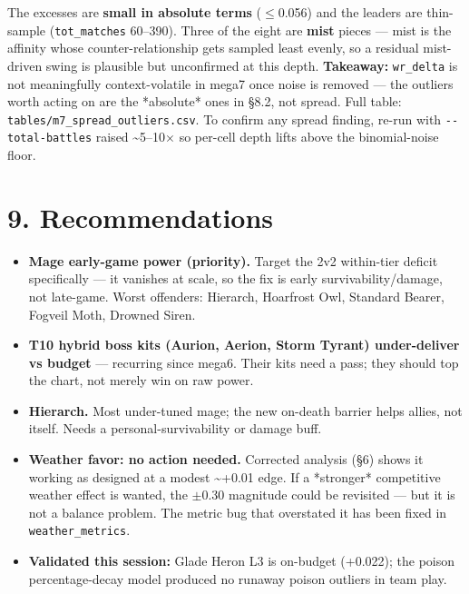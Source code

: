 \documentclass[10pt]{article}
\begin{document}
The excesses are \textbf{small in absolute terms} ($\leq$0.056) and the leaders are thin-sample (\texttt{tot\_\allowbreak{}matches} 60--390). Three of the eight are \textbf{mist} pieces --- mist is the affinity whose counter-relationship gets sampled least evenly, so a residual mist-driven swing is plausible but unconfirmed at this depth. \textbf{Takeaway:} \texttt{wr\_\allowbreak{}delta} is not meaningfully context-volatile in mega7 once noise is removed --- the outliers worth acting on are the *absolute* ones in \S{}8.2, not spread. Full table: \texttt{tables/\allowbreak{}m7\_\allowbreak{}spread\_\allowbreak{}outliers.\allowbreak{}csv}. To confirm any spread finding, re-run with \texttt{-\allowbreak{}-\allowbreak{}total-\allowbreak{}battles} raised \textasciitilde{}5--10$\times$ so per-cell depth lifts above the binomial-noise floor.\\

\section*{9. Recommendations}

\begin{itemize}
\item \textbf{Mage early-game power (priority).} Target the 2v2 within-tier deficit specifically --- it vanishes at scale, so the fix is early survivability/damage, not late-game. Worst offenders: Hierarch, Hoarfrost Owl, Standard Bearer, Fogveil Moth, Drowned Siren.
\item \textbf{T10 hybrid boss kits (Aurion, Aerion, Storm Tyrant) under-deliver vs budget} --- recurring since mega6. Their kits need a pass; they should top the chart, not merely win on raw power.
\item \textbf{Hierarch.} Most under-tuned mage; the new on-death barrier helps allies, not itself. Needs a personal-survivability or damage buff.
\item \textbf{Weather favor: no action needed.} Corrected analysis (\S{}6) shows it working as designed at a modest \textasciitilde{}+0.01 edge. If a *stronger* competitive weather effect is wanted, the $\pm$0.30 magnitude could be revisited --- but it is not a balance problem. The metric bug that overstated it has been fixed in \texttt{weather\_\allowbreak{}metrics}.
\item \textbf{Validated this session:} Glade Heron L3 is on-budget (+0.022); the poison percentage-decay model produced no runaway poison outliers in team play.
\end{itemize}
\end{document}
